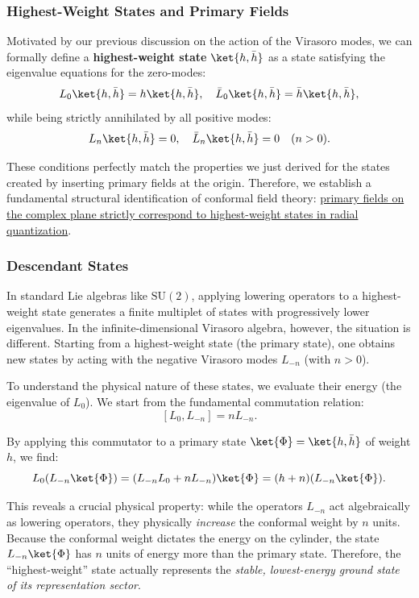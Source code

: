 \subsubsection{Highest-Weight States and Primary Fields}

Motivated by our previous discussion on the action of the Virasoro modes, we can formally define a \textbf{highest-weight state} \(\ket{h, \bar{h}}\) as a state satisfying the eigenvalue equations for the zero-modes:
\[
    L_0 \ket{h, \bar{h}} = h \ket{h, \bar{h}}, \quad \bar{L}_0 \ket{h, \bar{h}} = \bar{h} \ket{h, \bar{h}},
\]
while being strictly annihilated by all positive modes:
\[
    L_n \ket{h, \bar{h}} = 0, \quad \bar{L}_n \ket{h, \bar{h}} = 0 \quad (n > 0).
\]

These conditions perfectly match the properties we just derived for the states created by inserting primary fields at the origin. Therefore, we establish a fundamental structural identification of conformal field theory: \uline{primary fields on the complex plane strictly correspond to highest-weight states in radial quantization}.

\subsubsection{Descendant States}

In standard Lie algebras like \(\mathrm{SU}(2)\), applying lowering operators to a highest-weight state generates a finite multiplet of states with progressively lower eigenvalues. In the infinite-dimensional Virasoro algebra, however, the situation is different. Starting from a highest-weight state (the primary state), one obtains new states by acting with the negative Virasoro modes \(L_{-n}\) (with \(n > 0\)).

To understand the physical nature of these states, we evaluate their energy (the eigenvalue of \(L_0\)). We start from the fundamental commutation relation:
\[
    [L_0, L_{-n}] = n L_{-n}.
\]

By applying this commutator to a primary state \(\ket{\Phi} = \ket{h, \bar{h}}\) of weight \(h\), we find:
\[
    L_0 (L_{-n} \ket{\Phi}) = (L_{-n} L_0 + n L_{-n}) \ket{\Phi} = (h + n) (L_{-n} \ket{\Phi}).
\]

This reveals a crucial physical property: while the operators \(L_{-n}\) act algebraically as lowering operators, they physically \textit{increase} the conformal weight by \(n\) units. Because the conformal weight dictates the energy on the cylinder, the state \(L_{-n}\ket{\Phi}\) has \(n\) units of energy more than the primary state. Therefore, the ``highest-weight'' state actually represents the \textit{stable, lowest-energy ground state of its representation sector}.

